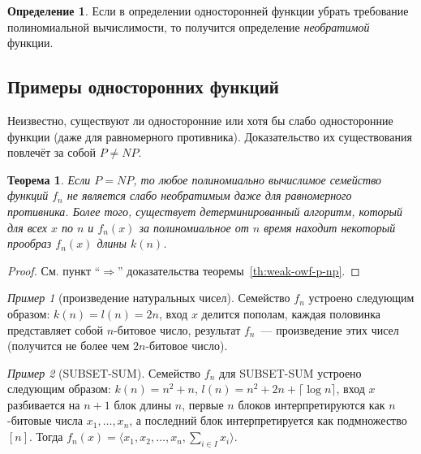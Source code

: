 \documentclass[12pt]{article}
\theoremstyle{definition}
\newtheorem{definition}{Определение}[section]
\theoremstyle{plain}
\newtheorem{theorem}{Теорема}[section]
\theoremstyle{remark}
\newtheorem{example}{Пример}[section]
\begin{document}
\begin{definition}
Если в определении односторонней функции убрать требование полиномиальной вычислимости,
то получится определение \emph{необратимой} функции.
\end{definition}

\subsection{Примеры односторонних функций}

Неизвестно, существуют ли односторонние или хотя бы слабо односторонние функции 
(даже для равномерного противника). Доказательство их существования повлечёт
за собой $P \neq NP$.

\begin{theorem}
Если $P=NP$, то любое полиномиально вычислимое семейство функций $f_n$ не является
слабо необратимым даже для равномерного противника. Более того, 
существует детерминированный алгоритм, который для всех $x$ по $n$ и 
$f_n(x)$ за полиномиальное от $n$ время находит некоторый прообраз 
$f_n(x)$ длины $k(n)$.
\end{theorem}
\begin{proof}
См. пункт ``$\Rightarrow$'' доказательства теоремы~\ref{th:weak-owf-p-np}.
\end{proof}
\begin{example}[произведение натуральных чисел]
Семейство $f_n$ устроено следующим образом: $k(n) = l(n) = 2n$, вход $x$ делится пополам, каждая половинка представляет собой $n$-битовое число, результат $f_n$~--- произведение этих чисел (получится не более чем $2n$-битовое число).
\end{example}
\begin{example}[SUBSET-SUM]
Семейство $f_n$ для SUBSET-SUM устроено следующим образом: 
$k(n) = n^2 + n$, $l(n) = n^2 + 2n + \lceil\log n\rceil$,
вход $x$ разбивается на $n+1$ блок длины $n$, 
первые $n$ блоков интерпретируются как $n$-битовые числа $x_1, \dotsc, x_n$, 
а последний блок интерпретируется как подмножество $[n]$. Тогда
$f_n(x) = \bigl\langle x_1, x_2, \dotsc, x_n, \sum_{i\in I} x_i \bigr\rangle$.
\end{example}
\end{document}
